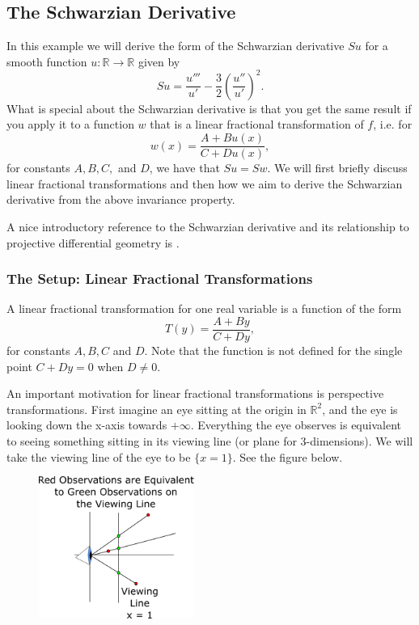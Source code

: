\subsection{The Schwarzian Derivative}

In this example we will derive the form of the Schwarzian derivative \(Su\) for a smooth function \(u:\mathbb R \to \mathbb R\)
given by
\begin{equation}
Su = \frac{u'''}{u'} - \frac{3}{2}\left(\frac{u''}{u'}\right)^2.
\end{equation}
What is special about the Schwarzian derivative is that you get the same result if you apply it to
a function \(w\) that is a linear fractional transformation of \(f\), i.e. for
\begin{equation}
w(x) = \frac{A + Bu(x)}{C + Du(x)},
\end{equation}
for constants \(A, B, C,\) and \(D\), we have that \(Su = Sw\). We will first briefly discuss 
linear fractional transformations and then how we aim to derive the Schwarzian derivative from the
above invariance property.

A nice introductory reference to the Schwarzian derivative and its relationship to projective differential geometry
is \cite{schwarzian}.

\subsubsection*{The Setup: Linear Fractional Transformations}

A linear fractional transformation for one real variable is a function of the form
\begin{equation}
T(y) = \frac{A + By}{C + Dy},
\end{equation}
for constants \(A, B, C\) and \(D\). Note that the function is not defined for the single point \(C + Dy = 0\) when
\(D\neq 0\).

An important motivation for linear fractional transformations is perspective transformations. First imagine an
eye sitting at the origin in \(\mathbb R^2\), and the eye is looking down the x-axis towards \(+\infty\). 
Everything the eye
observes is equivalent to seeing something sitting in its viewing line (or plane for 3-dimensions). We will
take the viewing line of the eye to be \(\{x = 1\}\). See the figure below.

\begin{figure}[h]
\centering
\includegraphics[width = 2in]{oneVarDiffCalc/perspective1.pdf}
\end{figure}

